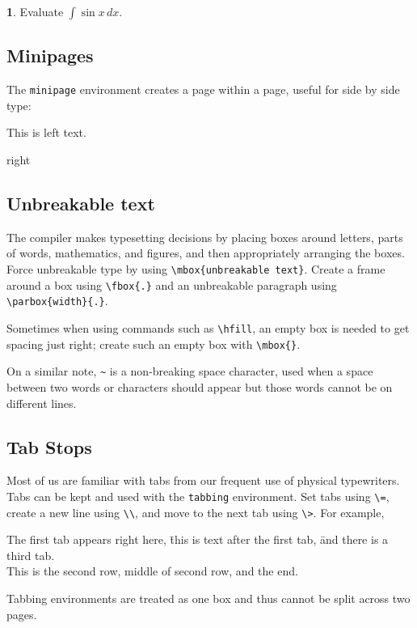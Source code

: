 \documentclass[11pt]{article}
\theoremstyle{definition}
\newtheorem{problem}{}
\begin{document}
\vfill

\begin{problem}
  Evaluate \(\displaystyle \int \sin x \, dx \).
\end{problem}

\vfill

\newpage

\subsection{Minipages}

The \verb~minipage~ environment creates a page within a page, useful for side
by side type:

\begin{center}
  \begin{minipage}{15eM}
    This is left text.
  \end{minipage}
  \begin{minipage}{15eM}
    right
  \end{minipage}
\end{center}

\subsection{Unbreakable text}

The compiler makes typesetting decisions by placing boxes around letters, parts
of words, mathematics, and figures, and then appropriately arranging the boxes.
Force unbreakable type by using
\verb~\mbox{unbreakable text}~.  Create a frame around a box using
\verb~\fbox{.}~ and an unbreakable paragraph using \verb~\parbox{width}{.}~.

Sometimes when using commands such as \verb~\hfill~, an empty box is needed to
get spacing just right; create such an empty box with \verb~\mbox{}~.

On a similar note, \verb!~! is a non-breaking space character, used when a
space between two words or characters should appear but those words cannot be
on different lines.

\subsection{Tab Stops}

Most of us are familiar with tabs from our frequent use of physical
typewriters.  Tabs can be kept and used with the \verb~tabbing~ environment.
Set tabs using \verb~\=~, create a new line using \verb~\\~, and move to the
next tab using \verb~\>~.  For example,
\begin{tabbing}
  The first tab appears right here,
  \= this is text after the first tab,
  \= and there is a third tab.  \\
  This is the second row,
  \>  middle of second row,
  \> and the end.
\end{tabbing}
Tabbing environments are treated as one box and thus cannot be split across two
pages.
\end{document}
